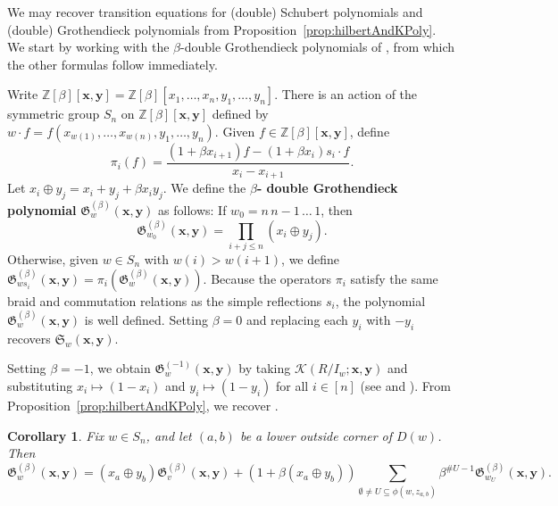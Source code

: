 \documentclass[12pt,reqno]{amsart}
\newtheorem{corollary}[theorem]{Corollary}
\newtheorem{Main Conjecture}[theorem]{Main Conjecture}
\theoremstyle{remark}
\theoremstyle{plain}
\newcommand{\mydef}[1]{{\bf #1}}
\begin{document}
We may recover transition equations for (double) Schubert polynomials and (double) Grothendieck polynomials from Proposition~\ref{prop:hilbertAndKPoly}.  We start by working with the $\beta$-double Grothendieck polynomials of \cite{FK94}, from which the other formulas follow immediately. 

Write $\mathbb Z[\beta][\mathbf x,\mathbf y]=\mathbb Z[\beta][x_1,\ldots,x_n,y_1,\ldots,y_n]$.  There is an action of the symmetric group $S_n$ on $\mathbb Z[\beta][\mathbf x,\mathbf y]$ defined by $w\cdot f=f(x_{w(1)},\ldots,x_{w(n)},y_1,\ldots, y_n)$.  Given $f\in \mathbb Z[\beta][\mathbf x,\mathbf y]$, define \[\pi_i(f)=\frac{(1+\beta x_{i+1})f-(1+\beta x_i)s_i\cdot f}{x_i-x_{i+1}}.\]
 Let $x_i\oplus y_j=x_i+y_j+\beta x_iy_j$.   We define the \mydef{$\beta$- double Grothendieck polynomial} $\mathfrak G^{(\beta)}_w(\mathbf x,\mathbf y)$ as follows:  If $w_0=n \, n-1 \, \ldots \, 1$, then 
 \[\mathfrak G^{(\beta)}_{w_0}(\mathbf x,\mathbf y)= \prod_{i+j\leq n} (x_i\oplus y_j).\]
 Otherwise, given $w\in S_n$ with $w(i)>w(i+1)$, we define $\mathfrak G^{(\beta)}_{ws_i}(\mathbf x,\mathbf y)=\pi_i(\mathfrak G^{(\beta)}_w(\mathbf x,\mathbf y))$.  Because the operators $\pi_i$ satisfy the same braid and commutation relations as the simple reflections $s_i$, the polynomial $\mathfrak G^{(\beta)}_w(\mathbf x,\mathbf y)$ is well defined.  Setting $\beta=0$ and replacing each $y_i$ with $-y_i$ recovers $\mathfrak S_w(\mathbf x,\mathbf y)$.
 
 Setting $\beta=-1$, we obtain $\mathfrak G^{(-1)}_w(\mathbf x,\mathbf y)$ by taking $\mathcal K(R/I_w;\mathbf x,\mathbf y)$ and substituting $x_i\mapsto (1-x_i)$ and $y_i\mapsto (1-y_i)$ for all $i\in [n]$ (see \cite[Theorem~2.1]{Buc02} and \cite[Theorem~A]{KM05}). From Proposition~\ref{prop:hilbertAndKPoly}, we recover \cite[Theorem~2.3]{Wei21}.

\begin{corollary}
\label{cor:transitiongrothendieck}
Fix $w\in S_n$, and let $(a,b)$ be a lower outside corner of $D(w)$.  Then \[\mathfrak G^{(\beta)}_w(\mathbf x,\mathbf y)=(x_a\oplus y_b) \mathfrak G_v^{(\beta)}(\mathbf x,\mathbf y)+(1+\beta(x_a\oplus y_b))\sum_{ \emptyset \neq U\subseteq \phi(w,z_{a,b})}\beta^{\#U-1}\mathfrak G_{w_U}^{(\beta)}(\mathbf x,\mathbf y).\]
\end{corollary}
\end{document}
